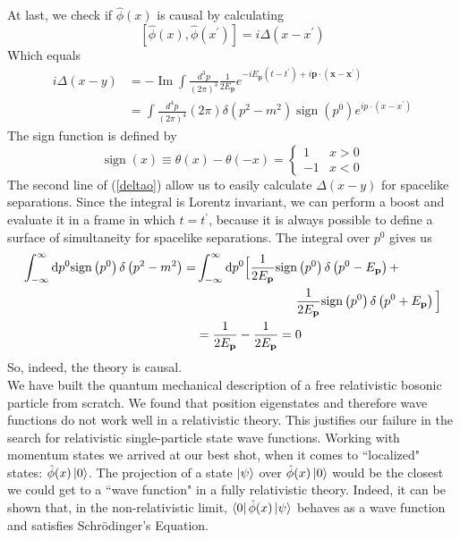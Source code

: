 At last, we check if $\hat{\phi}(x)$ is causal by calculating
\begin{equation}
\left[\hat{\phi}(x), \hat{\phi}\left(x^{\prime}\right)\right]=i \Delta\left(x-x^{\prime}\right)
\end{equation}
Which equals 
\begin{equation}
\begin{aligned}
i \Delta(x-y) &=-\operatorname{Im} \int \frac{d^{3} p}{(2 \pi)^{3}} \frac{1}{2 E_{\mathbf{p}}} e^{-i E_{\mathbf{p}}\left(t-t^{\prime}\right)+i \mathbf{p} \cdot\left(\mathbf{x}-\mathbf{x}^{\prime}\right)} \\
&=\int \frac{d^{4} p}{(2 \pi)^{4}}(2 \pi) \delta\left(p^{2}-m^{2}\right) \operatorname{sign}\left(p^{0}\right) e^{i p\cdot\left(x-x^{\prime}\right)}
\end{aligned}
\label{deltao}
\end{equation}
The sign function is defined by
\begin{equation}
\operatorname{sign}(x) \equiv \theta(x)-\theta(-x)=\left\{\begin{array}{rl}
1 & x>0 \\
-1 & x<0
\end{array}\right.
\end{equation}
The second line of (\ref{deltao}) allow us to easily calculate $\Delta(x-y)$ for spacelike separations. Since the integral is Lorentz invariant, we can perform a boost and evaluate it in a frame in which $t=t^\prime$, because it is always possible to define a surface of simultaneity for spacelike separations. The integral over $p^0$ gives us
\begin{equation}
\begin{aligned}
\int_{-\infty}^{\infty} \dd p^{0} \text{sign}\left(p^{0}\right) \delta\left(p^{2}-m^{2}\right)
=&\int_{-\infty}^{\infty} \dd p^{0}\Big{[}\frac{1}{2 E_{\mathbf{p}}} \text{sign}\left(p^{0}\right) \delta\left(p^{0}-E_{\mathbf{p}}\right)+\\ &\qquad\qquad\qquad\qquad\frac{1}{2 E_{\mathbf{p}}} \text{sign}\left(p^{0}\right) \delta\left(p^{0}+E_{\mathbf{p}}\right)\Big{]} \\
&=\frac{1}{2 E_{\mathbf{p}}}-\frac{1}{2 E_{\mathbf{p}}}=0
\end{aligned}
\end{equation}
So, indeed, the theory is causal.\\

We have built the quantum mechanical description of a free relativistic bosonic particle from scratch. We found that position eigenstates and therefore wave functions do not work well in a relativistic theory. This justifies our failure in the search for relativistic single-particle state wave functions. Working with momentum states we arrived at our best shot, when it comes to ``localized" states: $\hat{\phi}(x)\ket{0}$.  The projection of a state $\ket{\psi}$ over $\hat{\phi}(x)\ket{0}$ would be the closest we could get to a ``wave function" in a fully relativistic theory. Indeed, it can be shown that, in the non-relativistic limit, $\bra{0}\hat{\phi}(x)\ket{\psi}$ behaves as a wave function and satisfies Schrödinger's Equation. \cite{padmanabhan2016quantum}\\

